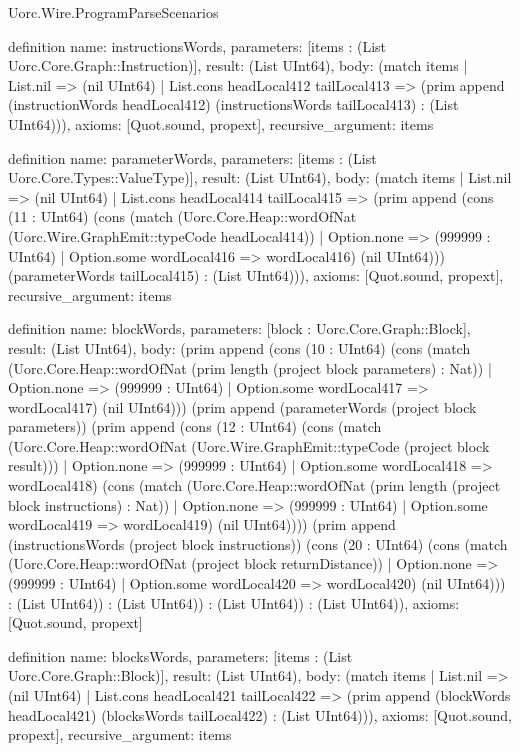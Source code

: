 \begin{lexlean}{Uorc.Wire.ProgramParseScenarios}
\begin{semanticmodule}
definition{
  name: instructionsWords,
  parameters: [items : (List Uorc.Core.Graph::Instruction)],
  result: (List UInt64),
  body: (match items
    | List.nil => (nil UInt64)
    | List.cons headLocal412 tailLocal413 => (prim append (instructionWords headLocal412) (instructionsWords tailLocal413) : (List UInt64))),
  axioms: [Quot.sound, propext],
  recursive_argument: items
}

definition{
  name: parameterWords,
  parameters: [items : (List Uorc.Core.Types::ValueType)],
  result: (List UInt64),
  body: (match items
    | List.nil => (nil UInt64)
    | List.cons headLocal414 tailLocal415 => (prim append (cons (11 : UInt64) (cons (match (Uorc.Core.Heap::wordOfNat (Uorc.Wire.GraphEmit::typeCode headLocal414))
      | Option.none => (999999 : UInt64)
      | Option.some wordLocal416 => wordLocal416) (nil UInt64))) (parameterWords tailLocal415) : (List UInt64))),
  axioms: [Quot.sound, propext],
  recursive_argument: items
}

definition{
  name: blockWords,
  parameters: [block : Uorc.Core.Graph::Block],
  result: (List UInt64),
  body: (prim append (cons (10 : UInt64) (cons (match (Uorc.Core.Heap::wordOfNat (prim length (project block parameters) : Nat))
    | Option.none => (999999 : UInt64)
    | Option.some wordLocal417 => wordLocal417) (nil UInt64))) (prim append (parameterWords (project block parameters)) (prim append (cons (12 : UInt64) (cons (match (Uorc.Core.Heap::wordOfNat (Uorc.Wire.GraphEmit::typeCode (project block result)))
    | Option.none => (999999 : UInt64)
    | Option.some wordLocal418 => wordLocal418) (cons (match (Uorc.Core.Heap::wordOfNat (prim length (project block instructions) : Nat))
    | Option.none => (999999 : UInt64)
    | Option.some wordLocal419 => wordLocal419) (nil UInt64)))) (prim append (instructionsWords (project block instructions)) (cons (20 : UInt64) (cons (match (Uorc.Core.Heap::wordOfNat (project block returnDistance))
    | Option.none => (999999 : UInt64)
    | Option.some wordLocal420 => wordLocal420) (nil UInt64))) : (List UInt64)) : (List UInt64)) : (List UInt64)) : (List UInt64)),
  axioms: [Quot.sound, propext]
}

definition{
  name: blocksWords,
  parameters: [items : (List Uorc.Core.Graph::Block)],
  result: (List UInt64),
  body: (match items
    | List.nil => (nil UInt64)
    | List.cons headLocal421 tailLocal422 => (prim append (blockWords headLocal421) (blocksWords tailLocal422) : (List UInt64))),
  axioms: [Quot.sound, propext],
  recursive_argument: items
}


\end{semanticmodule}
\end{lexlean}
